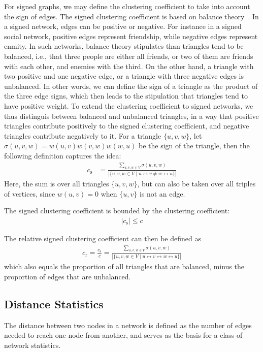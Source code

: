 \documentclass{article}
\begin{document}
For signed graphs, we may define the clustering coefficient to take into
account the sign of edges.  The signed clustering coefficient is based
on balance theory~\cite{kunegis:slashdot-zoo}.  In a signed network,
edges can be positive or negative.  For instance in a signed social
network, positive edges represent friendship, while negative edges
represent enmity.  In such networks, balance theory stipulates than
triangles tend to be balanced, i.e., that three people are either all
friends, or two of them are friends with each other, and enemies with
the third.  On the other hand, a triangle with two positive and one
negative edge, or a triangle with three negative edges is unbalanced.
In other words, we can define the sign of a triangle as the product of
the three edge signs, which then leads to the stipulation that triangles
tend to have positive weight.  To extend the clustering coefficient to
signed networks, we thus distinguis between balanced and unbalanced
triangles, in a way that positive triangles contribute positively to the
signed clustering coefficient, and negative triangles contribute
negatively to it.  For a triangle $\{u,v,w\}$, let
$\sigma(u,v,w)=w(u,v)w(v,w)w(w,u)$ be the sign of the triangle, then the
following definition captures the idea:
\begin{align}
  c_{\mathrm s} &= \frac {\sum_{u,v,w\in V} \sigma(u,v,w)} {|\{ u, v, w
    \in V \mid u \leftrightarrow v \neq w \leftrightarrow u \}|}
\end{align}
Here, the sum is over all triangles $\{u,v,w\}$, but can also be taken
over all triples of vertices, since $w(u,v)=0$ when $\{u,v\}$ is not an
edge.

The signed clustering coefficient is bounded by the clustering
coefficient:
\begin{align}
  | c_{\mathrm s} | \leq c
\end{align}

The relative signed clustering coefficient can then be defined as
\begin{align}
  c_{\mathrm r} = \frac {c_{\mathrm s}} c = \frac {\sum_{u,v,w\in V}
    \sigma(u,v,w)} {|\{ u, v, w \in V \mid u \leftrightarrow v \leftrightarrow w \leftrightarrow u \}|}
\end{align}
which also equals the proportion of all triangles that are balanced,
minus the proportion of edges that are unbalanced.

\subsection{Distance Statistics}
\label{sec:distance-statistics}
The distance between two nodes in a network is defined as the number of
edges needed to reach one node from another, and serves as the basis for
a class of network statistics.
\end{document}
